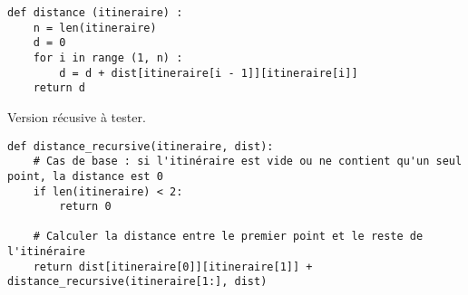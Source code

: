 \ifprof
\begin{corrige}
\begin{lstlisting}
def distance (itineraire) :
    n = len(itineraire)
    d = 0
    for i in range (1, n) :
        d = d + dist[itineraire[i - 1]][itineraire[i]]
    return d
\end{lstlisting}
\end{corrige}
\else
\fi

\ifprof
\begin{corrige}
Version récusive à tester.
\begin{lstlisting}
def distance_recursive(itineraire, dist):
    # Cas de base : si l'itinéraire est vide ou ne contient qu'un seul point, la distance est 0
    if len(itineraire) < 2:
        return 0

    # Calculer la distance entre le premier point et le reste de l'itinéraire
    return dist[itineraire[0]][itineraire[1]] + distance_recursive(itineraire[1:], dist)
\end{lstlisting}
\end{corrige}
\else
\fi